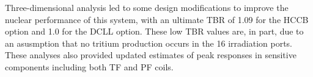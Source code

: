 Three-dimensional analysis led to some design modifications to improve the
nuclear performance of this system, with an ultimate \gls{TBR} of 1.09 for the
\gls{HCCB} option and 1.0 for the \gls{DCLL} option.  These low \gls{TBR}
values are, in part, due to an asusmption that no tritium production occurs in
the 16 irradiation ports.  These analyses also provided updated estimates of
peak responses in sensitive components including both \gls{TF} and \gls{PF}
coils.

